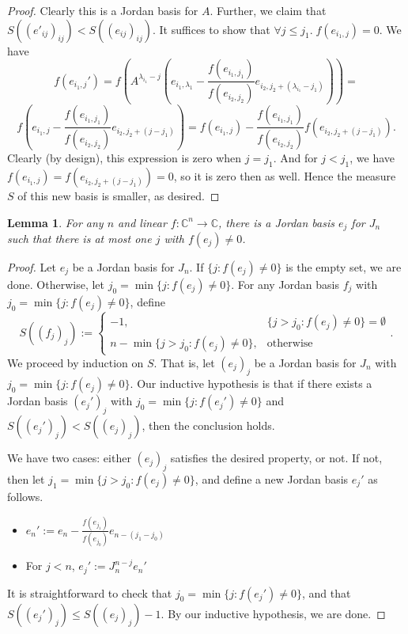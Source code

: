 \documentclass[12pt,psamsfonts]{article}
\newtheorem{lemma}[theorem]{Lemma}
\begin{document}
\begin{proof}
    Clearly this is a Jordan basis for \(A\).
    Further, we claim that \(S((e'_{ij})_{ij})  < S((e_{ij})_{ij})\).
    It suffices to show that \(\forall j \leq j_1. \; f (e_{i_1,j}) = 0\).
    We have 
    \[f (e_{i_1,j}') = f\left(A^{\lambda_{i_1} - j}\left(e_{i_1, \lambda_1} - \frac{f(e_{i_1, j_1})}{f(e_{i_2, j_2})}e_{i_2, j_2 + (\lambda_{i_1} - j_1)}\right)\right) =\]
    \[f\left(e_{i_1, j} - \frac{f(e_{i_1, j_1})}{f(e_{i_2, j_2})} e_{i_2, j_2 + (j - j_1)}\right) = f(e_{i_1, j}) - \frac{f(e_{i_1, j_1})}{f(e_{i_2, j_2})} f(e_{i_2, j_2 + (j - j_1)}).\]
    Clearly (by design), this expression is zero when \(j = j_1\).
    And for \(j < j_1\), we have \(f(e_{i_1, j}) = f(e_{i_2, j_2 + (j - j_1)}) = 0\), so it is zero then as well.
    Hence the measure \(S\) of this new basis is smaller, as desired.
\end{proof}

\begin{lemma}\label{normalization_helper_two}
    For any \(n\) and linear \(f : \mathbb{C}^n \to \mathbb{C}\), there is a Jordan basis \(e_j\) for \(J_n\) such that there is at most one \(j\) with \(f(e_j) \neq 0\).
\end{lemma}
\begin{proof}
    Let \(e_j\) be a Jordan basis for \(J_n\).
    If \(\{j : f(e_j) \neq 0\}\) is the empty set, we are done.
    Otherwise, let \(j_0 = \min\{j : f(e_j) \neq 0\}\).
    For any Jordan basis \(f_j\) with \(j_0 = \min\{j : f(e_j) \neq 0\}\), define 
    \[S((f_j)_j) := \begin{cases}
        -1, & \{j > j_0 : f(e_j) \neq 0\} = \emptyset \\
        n - \min\{j > j_0 : f(e_j) \neq 0\}, & \textrm{otherwise}
    \end{cases}.\]
    We proceed by induction on \(S\).
    That is, let \((e_j)_j\) be a Jordan basis for \(J_n\) with \(j_0 = \min\{j : f(e_j) \neq 0\}\).
    Our inductive hypothesis is that if there exists a Jordan basis \((e_j')_j\) with \(j_0 = \min\{j : f(e_j') \neq 0\}\) and \(S((e_j')_j) < S((e_j)_j)\), then the conclusion holds.
    \par We have two cases: either \((e_j)_j\) satisfies the desired property, or not.
    If not, then let \(j_1 = \min\{j > j_0 : f(e_j) \neq 0\}\), and define a new Jordan basis \(e_j'\) as follows.
    \begin{itemize}
        \item \(e_n' := e_n - \frac{f(e_{j_1})}{f(e_{j_0})} e_{n - (j_1 - j_0)}\)
        \item For \(j < n\), \(e_j' := J_n^{n - j} e_n'\)
    \end{itemize}
    It is straightforward to check that \(j_0 = \min\{j : f(e_j') \neq 0\}\), and that \(S((e_j')_j) \leq S((e_j)_j) - 1\).
    By our inductive hypothesis, we are done.
\end{proof}
\end{document}
